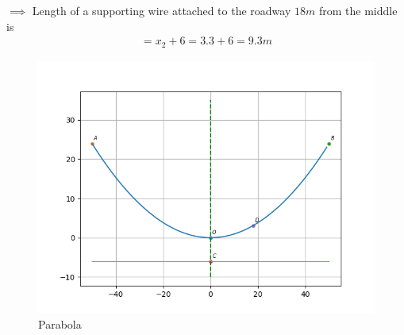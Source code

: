 \documentclass[journal,12pt,twocolumn]{IEEEtran}
\begin{document}
$\implies$ Length of a supporting wire attached to the roadway $18 m$ from the middle is 
\begin{align}
    = x_2 + 6 = 3.3 + 6 = 9.3 m    
\end{align}

\begin{figure}[!htb]
    \centering
    \includegraphics[width=\columnwidth]{figs/parabola.png}
    \caption{Parabola}
    \label{fig:parabola}
\end{figure}
\end{document}
